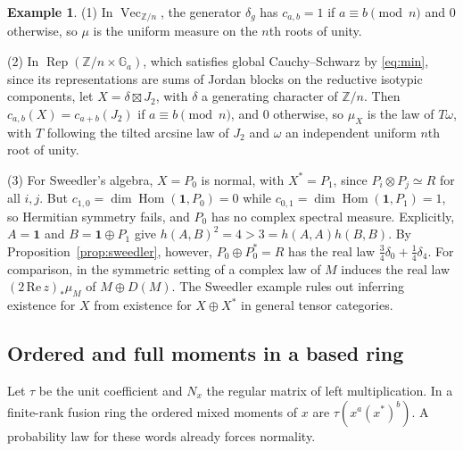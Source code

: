 \documentclass[11pt,reqno]{amsart}
\theoremstyle{definition}
\newtheorem{example}[theorem]{Example}
\newcommand{\Hom}{\operatorname{Hom}}
\newcommand{\one}{\mathbf 1}
\newcommand{\ZZ}{\mathbb Z}
\newcommand{\Ga}{\mathbb G_a}
\newcommand{\Rep}{\operatorname{Rep}}
\newcommand{\Vect}{\operatorname{Vec}}
\begin{document}
\begin{example}\label{ex:complex}
(1) In $\Vect_{\ZZ/n}$, the generator $\delta_g$ has $c_{a,b}=1$ if $a\equiv b\pmod n$ and $0$ otherwise, so $\mu$ is the uniform measure on the $n$th roots of unity.

(2) In $\Rep(\ZZ/n\times\Ga)$, which satisfies global Cauchy--Schwarz by \eqref{eq:min}, since its representations are sums of Jordan blocks on the reductive isotypic components, let $X=\delta\boxtimes J_2$, with $\delta$ a generating character of $\ZZ/n$. Then $c_{a,b}(X)=c_{a+b}(J_2)$ if $a\equiv b\pmod n$, and $0$ otherwise, so $\mu_X$ is the law of $T\omega$, with $T$ following the tilted arcsine law of $J_2$ and $\omega$ an independent uniform $n$th root of unity.

(3) For Sweedler's algebra, $X=P_0$ is normal, with $X^*=P_1$, since $P_i\otimes P_j\simeq R$ for all $i,j$. But $c_{1,0}=\dim\Hom(\one,P_0)=0$ while $c_{0,1}=\dim\Hom(\one,P_1)=1$, so Hermitian symmetry fails, and $P_0$ has no complex spectral measure. Explicitly, $A=\one$ and $B=\one\oplus P_1$ give $h(A,B)^2=4>3=h(A,A)h(B,B)$. By Proposition~\ref{prop:sweedler}, however, $P_0\oplus P_0^*=R$ has the real
law $\frac34\delta_0+\frac14\delta_4$. For comparison, in the symmetric
setting of \cite[Proposition~2.8(2)]{FFK} a complex law of $M$ induces
the real law $(2\,\mathrm{Re}\,z)_*\mu_M$ of $M\oplus D(M)$. The Sweedler
example rules out inferring existence for $X$ from existence for
$X\oplus X^*$ in general tensor categories.
\end{example}

\subsection{Ordered and full moments in a based ring}
Let $\tau$ be the unit coefficient and $N_x$ the regular matrix of left multiplication. In a finite-rank fusion ring the ordered mixed moments of $x$ are $\tau(x^a(x^*)^b)$. A probability law for these words already forces normality.
\end{document}
